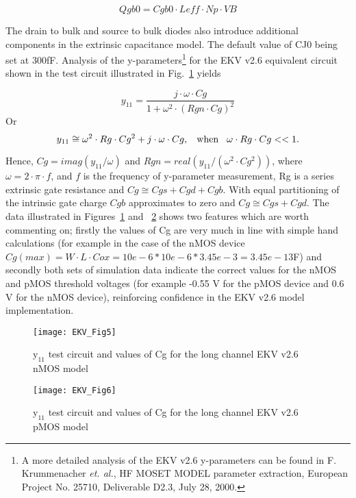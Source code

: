 \hspace{20mm}     \begin{equation} 
			Qgb0 = Cgb0 \cdot Leff \cdot Np \cdot VB
                  \end{equation}  

The drain to bulk and source to bulk diodes also introduce additional
components in the extrinsic capacitance model. The default value of
CJ0 being set at 300fF.  Analysis of the y-parameters\footnote{A more
detailed analysis of the EKV v2.6 y-parameters can be found in
F. Krummenacher \textit{et. al.}, HF MOSET MODEL parameter extraction,
European Project No. 25710, Deliverable D2.3, July 28, 2000.} for the
EKV v2.6 equivalent circuit shown in the test circuit illustrated in
Fig.~\ref{fig:EKV5} yields

\hspace{20mm}     \begin{equation} 
			y_{11} = \dfrac{j \cdot \omega \cdot Cg}{1+\omega^{2} \cdot (Rgn \cdot Cg)^{2}}
                  \end{equation}  
Or
\hspace{20mm}     \begin{equation} 
			y_{11} \cong \omega^{2} \cdot Rg \cdot Cg^{2} + j \cdot \omega \cdot Cg, \hspace{3mm} \textrm{when} \hspace{3mm} \omega \cdot Rg \cdot Cg << 1.
                  \end{equation}  

Hence, $ Cg = imag( y_{11}/ \omega)$ and $Rgn = real( y_{11}/(
\omega^{2} \cdot Cg^{2}))$, where $\omega = 2 \cdot \pi \cdot f$, and $f$
is the frequency of y-parameter measurement, Rg is a series extrinsic
gate resistance and $Cg \cong Cgs + Cgd + Cgb$.  With equal
partitioning of the intrinsic gate charge $Cgb$ approximates to zero
and $Cg \cong Cgs + Cgd$. The data illustrated in
Figures~\ref{fig:EKV5} and ~\ref{fig:EKV6} shows two features which
are worth commenting on; firstly the values of Cg are very much in
line with simple hand calculations (for example in the case of the
nMOS device $Cg(max) = W \cdot L \cdot Cox = 10e-6 * 10e-6* 3.45e-3 =
3.45e-13$F) and secondly both sets of simulation data indicate the
correct values for the nMOS and pMOS threshold voltages (for example
-0.55 V for the pMOS device and 0.6 V for the nMOS device),
reinforcing confidence in the EKV v2.6 model implementation.

\begin{figure} 
  \centering
  \texttt{[image: EKV\_Fig5]}
  \caption{$\mathrm{y_{11}}$ test circuit and values of Cg for the long channel EKV v2.6 nMOS model}
  \label{fig:EKV5}
\end{figure} 
\begin{figure}
  \centering
  \texttt{[image: EKV\_Fig6]}
  \caption{$\mathrm{y_{11}}$ test circuit and values of Cg for the long channel EKV v2.6 pMOS model}
  \label{fig:EKV6}
\end{figure}  



